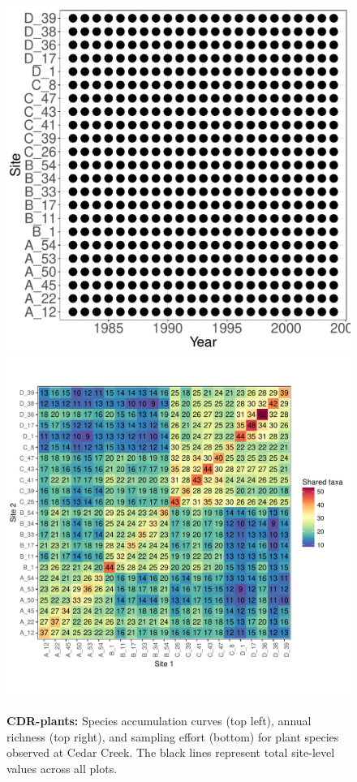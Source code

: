 \documentclass[11pt, oneside]{article}
\begin{document}
\begin{figure}[h!]
\includegraphics[scale = 0.4]{cdr-plants-compagnoni_spatiotemporal_sampling_effort.pdf}
\includegraphics[scale = 0.4]{cdr-plants-compagnoni_spp_shared.pdf}
\caption{{\bf CDR-plants:} Species accumulation curves (top left),  annual richness (top right), and sampling effort (bottom)  for plant species observed at Cedar Creek. The black lines represent total site-level values across all plots.}
\label{cdr-plants}
\end{figure}
\end{document}
